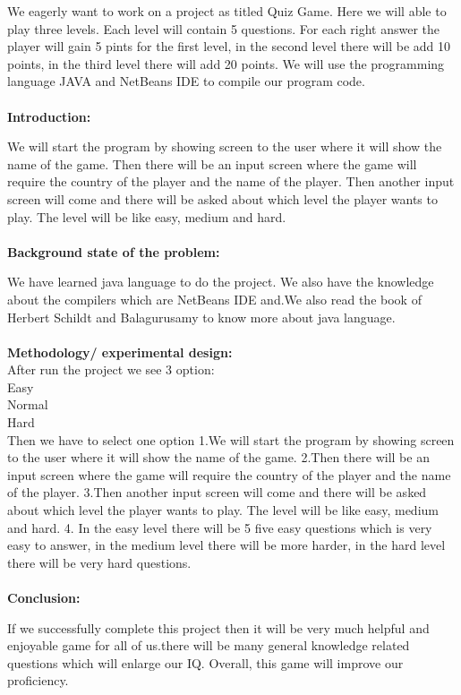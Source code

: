 \documentclass{article}
\begin{document}
	\large{We eagerly want to work on a project as titled Quiz Game. Here we will able to play three levels. Each level will contain 5 questions. For each right answer the player will gain 5 pints for the first level, in the second level there will be add 10 points, in the third level there will add 20 points. We will use the programming language JAVA and NetBeans IDE to compile our program code.}\\\\
	\huge\textbf{{Introduction: }}

	\large{We will start the program by showing screen to the user where it will show the name of the game. Then there will be an input screen where the game will require the country of the player and the name of the player. Then another input screen will come and there will be asked about which level the player wants to play. The level will be like easy, medium and hard. }\\\\
	\huge\textbf{{Background state of the problem:}}
	
	\large{We have learned java language to do the project. We also have the knowledge about the compilers which are NetBeans IDE and.We also read the book of Herbert Schildt and Balagurusamy to know more about java language. 
	 }\\\\
	\huge\textbf{{Methodology/ experimental design:}}\\
	\large{After run the project we see 3 option:\\
		Easy\\ 
		Normal\\ 
		Hard\\
		Then we have to select one option 
		1.We will start the program by showing screen to the user where it will show the name of the game. 
		2.Then there will be an input screen where the game will require the country of the player and the name of the player. 
		3.Then another input screen will come and there will be asked about which level the player wants to play. The level will be like easy, medium and hard. 
		4. In the easy level there will be 5 five easy questions which is very easy to answer, in the medium level there will be more harder, in the hard level there will be very hard questions.
		}\\\\
	\huge\textbf{{Conclusion:}}
	
	\large{If we successfully complete this project then it will be very much helpful and enjoyable game for all of us.there will be many general knowledge related questions which will enlarge our IQ. Overall,  this game will improve our proficiency. }
	
\end{document}

